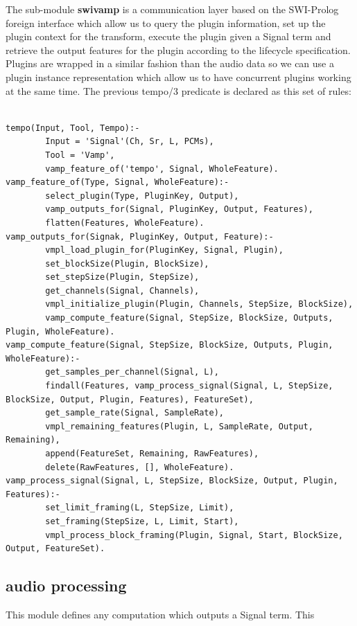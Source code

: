 \documentclass[runningheads]{llncs}
\begin{document}
The sub-module \textbf{swivamp} is a communication layer based on the SWI-Prolog foreign interface which allow us to query the plugin information, set up the plugin context for the transform, execute the plugin given a Signal term and retrieve the output features for the plugin according to the lifecycle specification. Plugins are wrapped in a similar fashion than the audio data so we can use a plugin instance representation which allow us to have concurrent plugins working at the same time. The previous tempo/3 predicate is declared as this set of rules:

\begin{verbatim}

tempo(Input, Tool, Tempo):-
        Input = 'Signal'(Ch, Sr, L, PCMs),
        Tool = 'Vamp',
        vamp_feature_of('tempo', Signal, WholeFeature).
vamp_feature_of(Type, Signal, WholeFeature):-
        select_plugin(Type, PluginKey, Output),
        vamp_outputs_for(Signal, PluginKey, Output, Features),
        flatten(Features, WholeFeature).
vamp_outputs_for(Signak, PluginKey, Output, Feature):-
        vmpl_load_plugin_for(PluginKey, Signal, Plugin),
        set_blockSize(Plugin, BlockSize),
        set_stepSize(Plugin, StepSize),
        get_channels(Signal, Channels),
        vmpl_initialize_plugin(Plugin, Channels, StepSize, BlockSize),
        vamp_compute_feature(Signal, StepSize, BlockSize, Outputs, Plugin, WholeFeature).
vamp_compute_feature(Signal, StepSize, BlockSize, Outputs, Plugin, WholeFeature):-
        get_samples_per_channel(Signal, L),
        findall(Features, vamp_process_signal(Signal, L, StepSize, BlockSize, Output, Plugin, Features), FeatureSet),
        get_sample_rate(Signal, SampleRate),
        vmpl_remaining_features(Plugin, L, SampleRate, Output, Remaining),
        append(FeatureSet, Remaining, RawFeatures),
        delete(RawFeatures, [], WholeFeature).
vamp_process_signal(Signal, L, StepSize, BlockSize, Output, Plugin, Features):-
        set_limit_framing(L, StepSize, Limit),
        set_framing(StepSize, L, Limit, Start),
        vmpl_process_block_framing(Plugin, Signal, Start, BlockSize, Output, FeatureSet).

\end{verbatim}

\subsection{audio processing}\label{subsec:swilasdpa}

This module defines any computation which outputs a Signal term. This 
\end{document}
